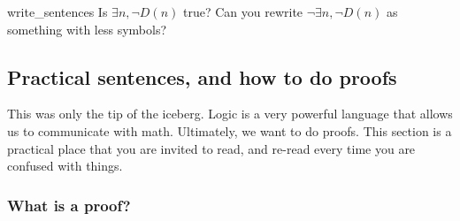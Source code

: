 \begin{cex}{}{write_sentences}
    Is \( \exists n, \neg D(n) \) true? Can you rewrite \( \neg \exists n, \neg D(n) \) as something with less symbols?
\end{cex}


\subsection{Practical sentences, and how to do proofs}
\label{practical_section}

This was only the tip of the iceberg. Logic is a very powerful language that allows us to communicate with math. Ultimately, we want to do proofs. This section is a practical place that you are invited to read, and re-read every time you are confused with things. 

\subsubsection{What is a proof?}


